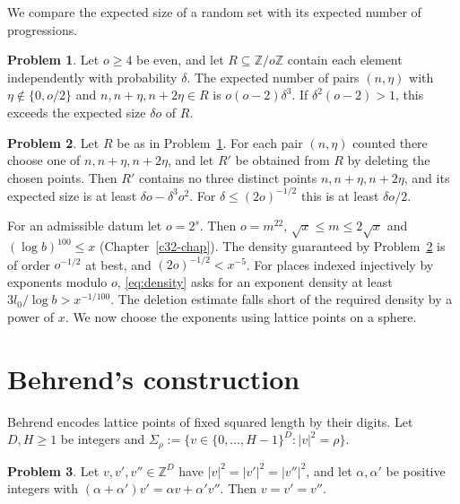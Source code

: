 \documentclass[reqno]{amsart}
\newcounter{chap}
\theoremstyle{definition}
\newtheorem{problem}{Problem}[section]
\theoremstyle{plain}
\newcommand{\Z}{\mathbb{Z}}
\begin{document}
We compare the expected size of a random set with its expected number of progressions.

\begin{problem}\label{pr:random-ap}
Let \(o \ge 4\) be even, and let \(R \subseteq \Z/o\Z\) contain each element independently with probability \(\delta\).  The expected number of pairs \((n, \eta)\) with \(\eta \notin \{0, o/2\}\) and \(n, n+\eta, n+2\eta \in R\) is \(o(o-2)\delta^3\).  If \(\delta^2(o-2) > 1\), this exceeds the expected size \(\delta o\) of \(R\).
\end{problem}

\begin{problem}\label{pr:random-deletion}
Let \(R\) be as in Problem~\ref{pr:random-ap}.  For each pair \((n, \eta)\) counted there choose one of \(n, n+\eta, n+2\eta\), and let \(R'\) be obtained from \(R\) by deleting the chosen points.  Then \(R'\) contains no three distinct points \(n, n+\eta, n+2\eta\), and its expected size is at least \(\delta o - \delta^3 o^2\).  For \(\delta \le (2o)^{-1/2}\) this is at least \(\delta o/2\).
\end{problem}

For an admissible datum let \(o = 2^s\).  Then \(o = m^{22}\), \(\sqrt{x} \le m \le 2\sqrt{x}\) and \((\log b)^{100} \le x\) (Chapter~\ref{c32-chap}).  The density guaranteed by Problem~\ref{pr:random-deletion} is of order \(o^{-1/2}\) at best, and \((2o)^{-1/2} < x^{-5}\).  For places indexed injectively by exponents modulo \(o\), \eqref{eq:density} asks for an exponent density at least \(3l_0/\log b > x^{-1/100}\).  The deletion estimate falls short of the required density by a power of \(x\).  We now choose the exponents using lattice points on a sphere.

\section{Behrend's construction}\label{sec:behrend}

Behrend \cite{Beh} encodes lattice points of fixed squared length by their digits.  Let \(D, H \ge 1\) be integers and \(\Sigma_\rho := \{v \in \{0, \dots, H-1\}^D : \lvert v\rvert^2 = \rho\}\).

\begin{problem}\label{pr:line-sphere}
Let \(v, v', v'' \in \Z^D\) have \(\lvert v\rvert^2 = \lvert v'\rvert^2 = \lvert v''\rvert^2\), and let \(\alpha, \alpha'\) be positive integers with \((\alpha + \alpha')v' = \alpha v + \alpha' v''\).  Then \(v = v' = v''\).
\end{problem}
\end{document}
